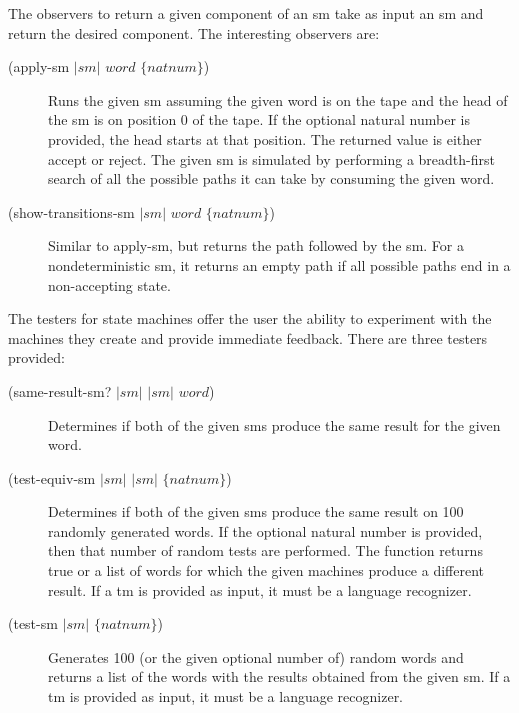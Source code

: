 \documentclass{eptcs}
\begin{document}
The observers to return a given component of an \textsf{sm} take as input an \textsf{sm} and return the desired component. The interesting observers are:
\begin{description}
  \item [(apply-sm $|\mathit{sm}|$ $word$ $\{natnum\}$)] Runs the given \textsf{sm} assuming the given word is on the tape and the head of the \textsf{sm} is on position 0 of the tape. If the optional natural number is provided, the head starts at that position. The returned value is either \textquotesingle accept or \textquotesingle reject. The given \textsf{sm} is simulated by performing a breadth-first search of all the possible paths it can take by consuming the given word.

  \item [(show-transitions-sm $|\mathit{sm}|$ $word$ $\{natnum\}$)] Similar to \textsf{apply-sm}, but returns the path followed by the \textsf{sm}. For a nondeterministic \textsf{sm}, it returns an empty path if all possible paths end in a non-accepting state.
\end{description}

The testers for state machines offer the user the ability to experiment with the machines they create and provide immediate feedback. There are three testers provided:
\begin{description}
  \item [(same-result-sm? $|\mathit{sm}|$ $|\mathit{sm}|$ $word$)] Determines if both of the given \textsf{sm}s produce the same result for the given word.

  \item [(test-equiv-sm $|\mathit{sm}|$ $|\mathit{sm}|$ $\{natnum\}$)] Determines if both of the given \textsf{sm}s produce the same result on 100 randomly generated words. If the optional natural number is provided, then that number of random tests are performed. The function returns true or a list of words for which the given machines produce a different result. If a \textsf{tm} is provided as input, it must be a language recognizer.

  \item [(test-sm $|\mathit{sm}|$ $\{natnum\}$)] Generates 100 (or the given optional number of) random words and returns a list of the words with the results obtained from the given \textsf{sm}. If a \textsf{tm} is provided as input, it must be a language recognizer.
\end{description}
\end{document}
